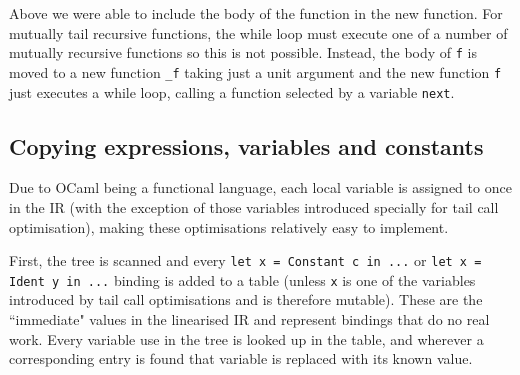 Above we were able to include the body of the function in the new function. For mutually tail recursive functions, the while loop must execute one of a number of mutually recursive functions so this is not possible. Instead, the body of \verb|f| is moved to a new function \verb|_f| taking just a unit argument and the new function \verb|f| just executes a while loop, calling a function selected by a variable \verb|next|.



\subsection{Copying expressions, variables and constants}
Due to OCaml being a functional language, each local variable is assigned to once in the IR (with the exception of those variables introduced specially for tail call optimisation), making these optimisations relatively easy to implement. 

First, the tree is scanned and every \verb|let x = Constant c in ...| or \verb|let x = Ident y in ...| binding is added to a table (unless \verb|x| is one of the variables introduced by tail call optimisations and is therefore mutable). These are the ``immediate" values in the linearised IR and represent bindings that do no real work. Every variable use in the tree is looked up in the table, and wherever a corresponding entry is found that variable is replaced with its known value. 

